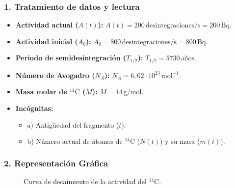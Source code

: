 \subsubsection*{1. Tratamiento de datos y lectura}
\begin{itemize}
    \item \textbf{Actividad actual ($A(t)$):} $A(t) = 200 \, \text{desintegraciones/s} = 200 \, \text{Bq}$.
    \item \textbf{Actividad inicial ($A_0$):} $A_0 = 800 \, \text{desintegraciones/s} = 800 \, \text{Bq}$.
    \item \textbf{Periodo de semidesintegración ($T_{1/2}$):} $T_{1/2} = 5730 \, \text{años}$.
    \item \textbf{Número de Avogadro ($N_A$):} $N_A = 6,02 \cdot 10^{23} \, \text{mol}^{-1}$.
    \item \textbf{Masa molar de $^{14}\text{C}$ ($M$):} $M = 14 \, \text{g/mol}$.
    \item \textbf{Incógnitas:}
    \begin{itemize}
        \item a) Antigüedad del fragmento ($t$).
        \item b) Número actual de átomos de $^{14}\text{C}$ ($N(t)$) y su masa ($m(t)$).
    \end{itemize}
\end{itemize}

\subsubsection*{2. Representación Gráfica}
\begin{figure}[H]
    \centering
    \caption{Curva de decaimiento de la actividad del $^{14}\text{C}$.}
\end{figure}

